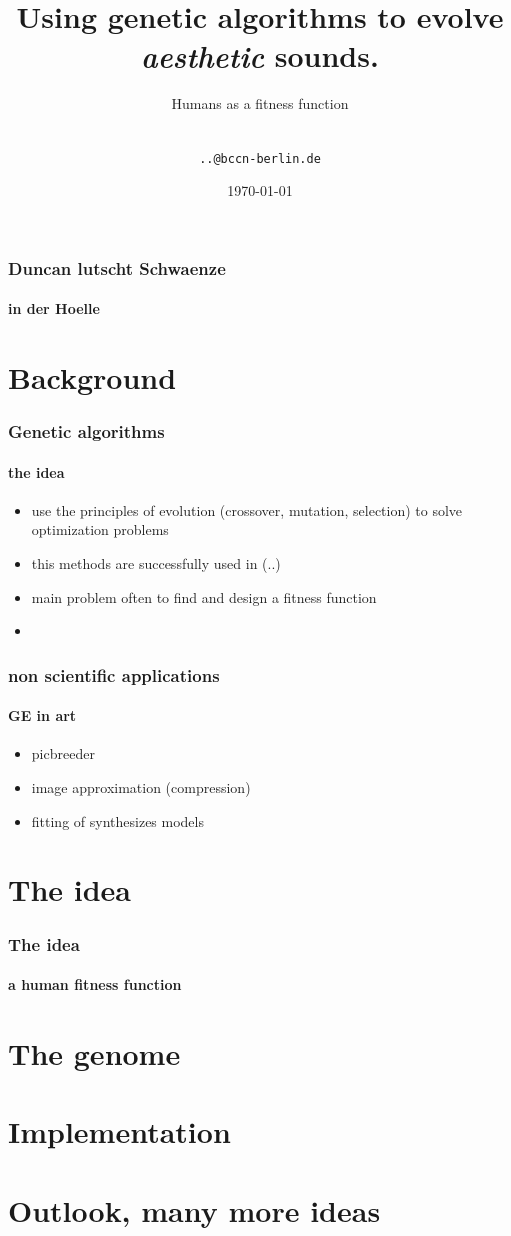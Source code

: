 \documentclass{beamer}
\title[Sound Evolution] {Using genetic algorithms to evolve \emph{aesthetic} sounds.}
\subtitle{Humans as a fitness function}
\author[Duncan, Matthias, Rafael, Mirko \& Stephan] { \\\texttt{..@bccn-berlin.de}}
\date[SS 2010] {\today}
\begin{document}
\frame{\titlepage}

\begin{frame}
	\frametitle{Duncan lutscht Schwaenze}
	\framesubtitle{in der Hoelle}
	
\end{frame}


\section{Background} %
\label{sg:sec:background}

\begin{frame}
	\frametitle{Genetic algorithms}
	\framesubtitle{the idea}
	
	\begin{itemize}
		\item<1-> use the principles of evolution (crossover, mutation, selection)
		to solve optimization problems
		\item<2-> this methods are successfully used in (..) 
		\item<3-> main problem often to find and design a fitness function
		\item<+-> 
	\end{itemize}
\end{frame}

\begin{frame}
	\frametitle{non scientific applications}
	\framesubtitle{GE in art}
	
	\begin{itemize}
		\item<1-> picbreeder
		\item<2-> image approximation (compression)
		\item<3-> fitting of synthesizes models
	\end{itemize}
	
\end{frame}



\section{The idea} %
\label{sg:sec:the_idea}

\begin{frame}
	\frametitle{The idea}
	\framesubtitle{a human fitness function}
	
\end{frame}



\section{The genome} %
\label{sg:sec:the_genome}



\section{Implementation} %
\label{sg:sec:imple}



\section{Outlook, many more ideas} %
\label{sg:sec:outlook_many_more_ideas}

\end{document}
